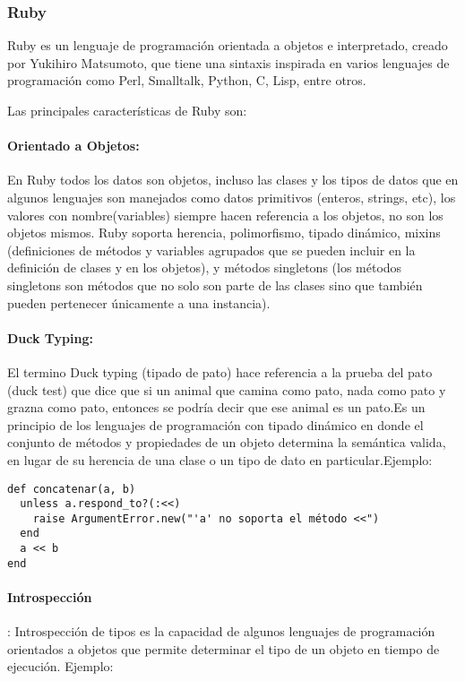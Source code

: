 \subsubsection{Ruby}
\label{tec:ruby}

Ruby \cite{ruby_lang} es un lenguaje de programación orientada a objetos e interpretado, creado por Yukihiro Matsumoto, que tiene una sintaxis inspirada en varios lenguajes de programación como Perl, Smalltalk, Python, C, Lisp, entre otros.

Las principales características de Ruby son:

\paragraph{Orientado a Objetos:}
En Ruby todos los datos son objetos, incluso las clases y los tipos de datos que en algunos lenguajes son manejados como datos primitivos (enteros, strings, etc), los valores con nombre(variables) siempre hacen referencia a los objetos, no son los objetos mismos. \newline Ruby soporta herencia, polimorfismo, tipado dinámico, mixins (definiciones de métodos y variables agrupados que se pueden incluir en la definición de clases y en los objetos), y métodos singletons (los métodos singletons son métodos que no solo son parte de las clases sino que también pueden pertenecer únicamente a una instancia).

\paragraph{Duck Typing:}
El termino Duck typing (tipado de pato) hace referencia a la prueba del pato (duck test) que dice que si un animal que camina como pato, nada como pato y grazna como pato, entonces se podría decir que ese animal es un pato.\newline Es un principio de los lenguajes de programación con tipado dinámico en donde el conjunto de métodos y propiedades de un objeto determina la semántica valida, en lugar de su herencia de una clase o un tipo de dato en particular.\newline Ejemplo:

\begin{verbatim}
def concatenar(a, b)
  unless a.respond_to?(:<<)
    raise ArgumentError.new("'a' no soporta el método <<")
  end
  a << b
end
\end{verbatim}

\paragraph{Introspección}:
Introspección de tipos es la capacidad de algunos lenguajes de programación orientados a objetos que permite determinar el tipo de un objeto en tiempo de ejecución. \newline Ejemplo:

